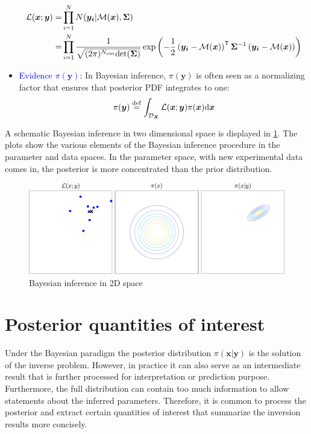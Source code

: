 \begin{itemize}[left=0pt]
        \begin{equation}        
        \label{eq: Likelihood function}
        \begin{aligned}
         \mathcal{L}(\boldsymbol{x};\boldsymbol{y}) =& \prod_{i=1}^{N} N(\boldsymbol{y_{i}}|\mathcal{M}(\boldsymbol{x}),\boldsymbol{\Sigma}) \\
         =& \prod_{i=1}^{N}\frac{1}{\sqrt{(2 \pi)^{N_{\rm{out}}}{\rm{det}} 
         (\boldsymbol{\Sigma})}}\exp\left(-\frac{1}{2}\left(\boldsymbol{y_i} - \mathcal{M}(\boldsymbol{x})\right)^{\mathsf{T}} \boldsymbol{\Sigma}^{-1}\left(\boldsymbol{y_i} - \mathcal{M}(\boldsymbol{x})\right)\right) 
        \end{aligned}
        \end{equation} 
    \item \textcolor{blue}{Evidence $\pi(\boldsymbol{y})$}: In Bayesian inference, $\pi(\boldsymbol{y})$ is often seen as a normalizing factor that ensures that posterior \acrshort{PDF} integrates to one:
    \begin{equation}
        \label{eq: evidence}
        \pi(\boldsymbol{y}) \stackrel{\rm{def}}{=} \int_{\mathcal{D}_{\boldsymbol{X}}} 
        {\mathcal{L}(\boldsymbol{x};\boldsymbol{y}) \pi(\boldsymbol{x})}
        {\rm{d}} \boldsymbol{x}
    \end{equation}
\end{itemize}

A schematic Bayesian inference in two dimensional space is displayed in \cref{fig: BI_2D}. The plots show the various elements of the Bayesian inference procedure in the parameter and data spaces. In the parameter space, with new experimental data comes in, the posterior is more concentrated than the prior distribution. 
\begin{figure}[htbp]
    \centering
    \includegraphics[width = 140mm]{Figures/figure-BI_2D.pdf}
    \caption{Bayesian inference in 2D space}
    \label{fig: BI_2D}
\end{figure}
\section{Posterior quantities of interest}
Under the Bayesian paradigm the posterior distribution $\pi(\boldsymbol{x}|\boldsymbol{y})$ is the solution of the inverse problem. However, in practice it can also serve as an intermediate result that is further processed for interpretation or prediction purpose. Furthermore, the full distribution can contain too much information to allow statements about the inferred parameters. Therefore, it is common to process the posterior and extract certain quantities of interest that summarize the inversion results more concisely.

